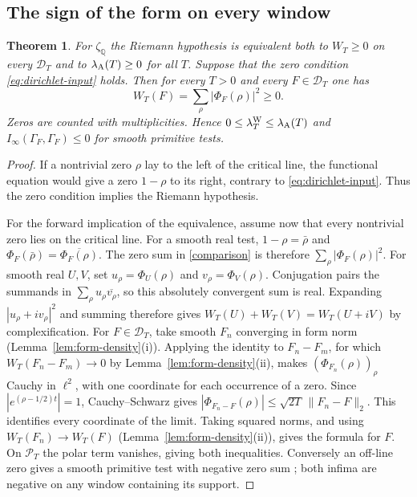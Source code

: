 \documentclass[10pt]{amsart}
\newtheorem{theorem}{Theorem}[section]
\theoremstyle{definition}
\theoremstyle{remark}
\begin{document}
\subsection*{The sign of the form on every window}
\begin{theorem}\label{thm:all-support}
For $\zeta_{\mathbb Q}$ the Riemann hypothesis is equivalent both to
$W_T\ge0$ on every $\mathcal D_T$ and to $\lambda_{\rm A}(T)\ge0$ for all $T$.
Suppose that the zero condition \eqref{eq:dirichlet-input} holds. Then for
every
$T>0$ and every $F\in\mathcal D_T$ one has
\[
 W_T(F)=\sum_{\rho}|\Phi_F(\rho)|^2\ge0 .
\]
Zeros are counted with multiplicities. Hence
$0\le\lambda^{\rm W}_T\le\lambda_{\rm A}(T)$ and
$I_\infty(\Gamma_F,\Gamma_F)\le0$ for smooth primitive tests.
\end{theorem}
\begin{proof}
If a nontrivial zero $\rho$ lay to the left of the critical line,
the functional equation would give a zero $1-\rho$ to its right,
contrary to \eqref{eq:dirichlet-input}. Thus the zero condition
implies the Riemann hypothesis.

For the forward implication of the equivalence, assume now that every
nontrivial zero lies on the critical line. For a smooth real test,
$1-\rho=\bar\rho$ and $\Phi_F(\bar\rho)=\overline{\Phi_F(\rho)}$.
The zero sum in \eqref{comparison} is therefore
$\sum_\rho |\Phi_F(\rho)|^2$.
For smooth real $U,V$, set $u_\rho=\Phi_U(\rho)$ and
$v_\rho=\Phi_V(\rho)$. Conjugation pairs the summands in
$\sum_\rho u_\rho\overline{v_\rho}$, so this absolutely convergent
sum is real. Expanding $|u_\rho+i v_\rho|^2$ and summing therefore
gives $W_T(U)+W_T(V)=W_T(U+iV)$ by complexification.
For $F\in\mathcal D_T$, take smooth $F_n$ converging in form norm
(Lemma~\ref{lem:form-density}(i)). Applying the identity to $F_n-F_m$,
for which $W_T(F_n-F_m)\to0$ by Lemma~\ref{lem:form-density}(ii),
makes $(\Phi_{F_n}(\rho))_\rho$ Cauchy in $\ell^2$, with one
coordinate for each occurrence of a zero. Since
$|e^{(\rho-1/2)t}|=1$, Cauchy--Schwarz gives
$|\Phi_{F_n-F}(\rho)|\le\sqrt{2T}\,\|F_n-F\|_2$.
This identifies every coordinate of the limit. Taking squared norms,
and using $W_T(F_n)\to W_T(F)$ (Lemma~\ref{lem:form-density}(ii)),
gives the formula for $F$. On $\mathcal P_T$ the polar term
vanishes, giving both inequalities. Conversely an off-line zero gives
a smooth primitive test with negative zero sum
\cite[Theorem~6.2]{Paper45}; both infima are negative on any window
containing its support.
\end{proof}
\end{document}
